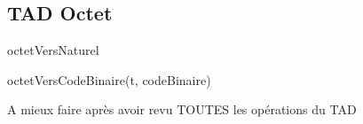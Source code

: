 \subsection{TAD Octet}

\begin{tad}
    \begin{tadOperations}{octetVersNaturel}
       
       
    \end{tadOperations}

    \begin{tadPreconditions}{octetVersCodeBinaire(t, codeBinaire)}
    \end{tadPreconditions}

    \begin{tadAxiomes}{}
        A mieux faire 	après avoir revu TOUTES les opérations du TAD
    \end{tadAxiomes}

\end{tad}
